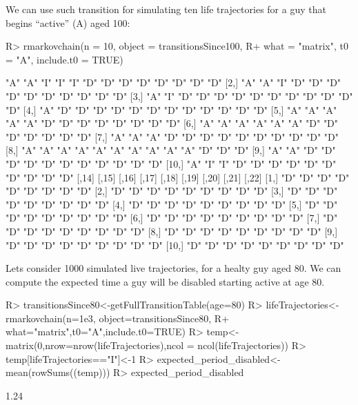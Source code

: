 \documentclass[
  nojss]{jss}
\begin{document}
We can use such transition for simulating ten life trajectories for a guy that begins ``active'' (A) aged 100:

\begin{CodeChunk}

\begin{CodeInput}
R> rmarkovchain(n = 10, object = transitionsSince100,
R+              what = "matrix", t0 = "A", include.t0 = TRUE)
\end{CodeInput}

\begin{CodeOutput}
      [,1] [,2] [,3] [,4] [,5] [,6] [,7] [,8] [,9] [,10] [,11] [,12] [,13]
 [1,] "A"  "A"  "I"  "I"  "I"  "D"  "D"  "D"  "D"  "D"   "D"   "D"   "D"  
 [2,] "A"  "A"  "I"  "D"  "D"  "D"  "D"  "D"  "D"  "D"   "D"   "D"   "D"  
 [3,] "A"  "I"  "D"  "D"  "D"  "D"  "D"  "D"  "D"  "D"   "D"   "D"   "D"  
 [4,] "A"  "D"  "D"  "D"  "D"  "D"  "D"  "D"  "D"  "D"   "D"   "D"   "D"  
 [5,] "A"  "A"  "A"  "A"  "A"  "D"  "D"  "D"  "D"  "D"   "D"   "D"   "D"  
 [6,] "A"  "A"  "A"  "A"  "A"  "A"  "D"  "D"  "D"  "D"   "D"   "D"   "D"  
 [7,] "A"  "A"  "A"  "D"  "D"  "D"  "D"  "D"  "D"  "D"   "D"   "D"   "D"  
 [8,] "A"  "A"  "A"  "A"  "A"  "A"  "A"  "A"  "A"  "A"   "D"   "D"   "D"  
 [9,] "A"  "A"  "D"  "D"  "D"  "D"  "D"  "D"  "D"  "D"   "D"   "D"   "D"  
[10,] "A"  "I"  "I"  "D"  "D"  "D"  "D"  "D"  "D"  "D"   "D"   "D"   "D"  
      [,14] [,15] [,16] [,17] [,18] [,19] [,20] [,21] [,22]
 [1,] "D"   "D"   "D"   "D"   "D"   "D"   "D"   "D"   "D"  
 [2,] "D"   "D"   "D"   "D"   "D"   "D"   "D"   "D"   "D"  
 [3,] "D"   "D"   "D"   "D"   "D"   "D"   "D"   "D"   "D"  
 [4,] "D"   "D"   "D"   "D"   "D"   "D"   "D"   "D"   "D"  
 [5,] "D"   "D"   "D"   "D"   "D"   "D"   "D"   "D"   "D"  
 [6,] "D"   "D"   "D"   "D"   "D"   "D"   "D"   "D"   "D"  
 [7,] "D"   "D"   "D"   "D"   "D"   "D"   "D"   "D"   "D"  
 [8,] "D"   "D"   "D"   "D"   "D"   "D"   "D"   "D"   "D"  
 [9,] "D"   "D"   "D"   "D"   "D"   "D"   "D"   "D"   "D"  
[10,] "D"   "D"   "D"   "D"   "D"   "D"   "D"   "D"   "D"  
\end{CodeOutput}
\end{CodeChunk}

Lets consider 1000 simulated live trajectories, for a healty guy aged 80. We can compute the expected time a guy will be disabled starting active at age 80.

\begin{CodeChunk}

\begin{CodeInput}
R> transitionsSince80<-getFullTransitionTable(age=80)
R> lifeTrajectories<-rmarkovchain(n=1e3, object=transitionsSince80,
R+                                what="matrix",t0="A",include.t0=TRUE)
R> temp<-matrix(0,nrow=nrow(lifeTrajectories),ncol = ncol(lifeTrajectories))
R> temp[lifeTrajectories=="I"]<-1
R> expected_period_disabled<-mean(rowSums((temp)))
R> expected_period_disabled
\end{CodeInput}

\begin{CodeOutput}
[1] 1.24
\end{CodeOutput}
\end{CodeChunk}
\end{document}
